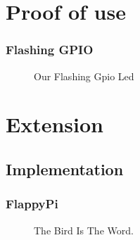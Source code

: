 \documentclass{beamer}
\begin{document}
\section{Proof of use}
\begin{frame}
\frametitle{Flashing GPIO}

\begin{figure}


\caption{Our Flashing Gpio Led}
\end{figure}


\end{frame}
\section{Extension}

\subsection{Implementation}

\begin{frame}
\frametitle{FlappyPi}

\begin{figure}
\caption{The Bird Is The Word.}
\end{figure}

\end{frame}
\end{document}
